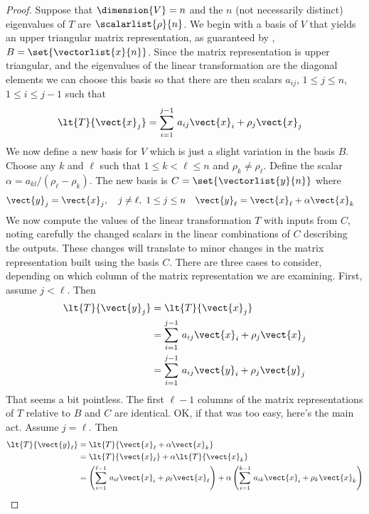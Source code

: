 %
\begin{proof}
%
Suppose that $\dimension{V}=n$ and the $n$ (not necessarily distinct) eigenvalues of $T$ are $\scalarlist{\rho}{n}$.   We begin with a basis of $V$ that yields an upper triangular matrix representation, as guaranteed by , $B=\set{\vectorlist{x}{n}}$. Since the matrix representation is upper triangular, and the eigenvalues of the linear transformation are the diagonal elements we can choose this basis so that there are then scalars $a_{ij}$, $1\leq j\leq n$, $1\leq i\leq j-1$ such that
%
\begin{align*}
\lt{T}{\vect{x}_j}&=\sum_{i=1}^{j-1}\,a_{ij}\vect{x}_i + \rho_j\vect{x}_j
\end{align*}
%
We now define a new basis for $V$ which is just a slight variation in the basis $B$.  Choose any $k$ and $\ell$ such that $1\leq k<\ell\leq n$ and $\rho_k\neq\rho_\ell$.  Define the scalar $\alpha=a_{kl}/\left(\rho_\ell-\rho_k\right)$.  The new basis is $C=\set{\vectorlist{y}{n}}$ where
%
\begin{align*}
\vect{y}_j&=\vect{x}_j,\quad j\neq\ell,\ 1\leq j\leq n
&
\vect{y}_\ell&=\vect{x}_\ell+\alpha\vect{x}_k
\end{align*}
%
We now compute the values of the linear transformation $T$ with inputs from $C$, noting carefully the changed scalars in the linear combinations of $C$ describing the outputs.  These changes will translate to minor changes in the matrix representation built using the basis $C$.  There are three cases to consider, depending on which column of the matrix representation we are examining.  First, assume $j<\ell$.  Then
%
\begin{align*}
\lt{T}{\vect{y}_j}
&=\lt{T}{\vect{x}_j}\\
&=\sum_{i=1}^{j-1}\,a_{ij}\vect{x}_i + \rho_j\vect{x}_j\\
&=\sum_{i=1}^{j-1}\,a_{ij}\vect{y}_i + \rho_j\vect{y}_j
\end{align*}
%
That seems a bit pointless.  The first $\ell-1$ columns of the matrix representations of $T$ relative to $B$ and $C$ are identical.  OK, if that was too easy, here's the main act.  Assume $j=\ell$.
Then
%
\begin{align*}
\lt{T}{\vect{y}_\ell}
&=\lt{T}{\vect{x}_\ell+\alpha\vect{x}_k}\\
%
&=\lt{T}{\vect{x}_\ell}+\alpha\lt{T}{\vect{x}_k}\\
%
&=\left(\sum_{i=1}^{\ell-1}\,a_{i\ell}\vect{x}_i + \rho_\ell\vect{x}_\ell\right)+
\alpha\left(\sum_{i=1}^{k-1}\,a_{ik}\vect{x}_i + \rho_k\vect{x}_k\right)\\

\end{align*}
\end{proof}
